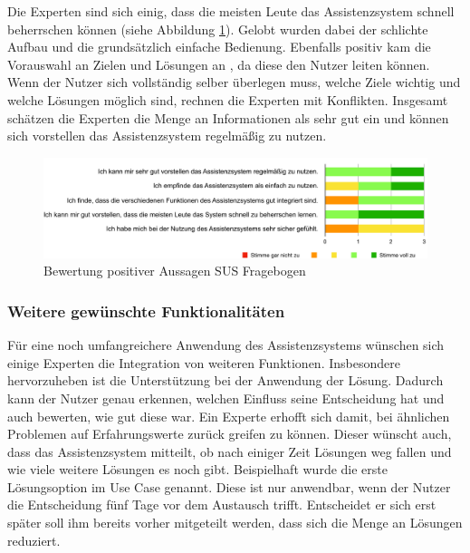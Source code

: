 Die Experten sind sich einig, dass die meisten Leute das Assistenzsystem schnell beherrschen können (siehe Abbildung \ref{pic:SUS-positiv}). Gelobt wurden dabei der schlichte Aufbau und die grundsätzlich einfache Bedienung. Ebenfalls positiv kam die Vorauswahl an Zielen und Lösungen an , da diese den Nutzer leiten können. Wenn der Nutzer sich vollständig selber überlegen muss, welche Ziele wichtig und welche Lösungen möglich sind, rechnen die Experten mit Konflikten. Insgesamt schätzen die Experten die Menge an Informationen als sehr gut ein und können sich vorstellen das Assistenzsystem regelmäßig zu nutzen.
\begin{figure}[htb]
\centering
\includegraphics[scale=0.55]{DA_files/Bilder/Validierung/Bild-positive_Aussagen.pdf}
\caption{Bewertung positiver Aussagen SUS Fragebogen}
\label{pic:SUS-positiv}
\end{figure}

\subsubsection*{Weitere gewünschte Funktionalitäten}
Für eine noch umfangreichere Anwendung des Assistenzsystems wünschen sich einige Experten die Integration von weiteren Funktionen. Insbesondere hervorzuheben ist die Unterstützung bei der Anwendung der Lösung. Dadurch kann der Nutzer genau erkennen, welchen Einfluss seine Entscheidung hat und auch bewerten, wie gut diese war. Ein Experte erhofft sich damit, bei ähnlichen Problemen auf Erfahrungswerte zurück greifen zu können. Dieser wünscht auch, dass das Assistenzsystem mitteilt, ob nach einiger Zeit Lösungen weg fallen und wie viele weitere Lösungen es noch gibt. Beispielhaft wurde die erste Lösungsoption im Use Case genannt. Diese ist nur anwendbar, wenn der Nutzer die Entscheidung fünf Tage vor dem Austausch trifft. Entscheidet er sich erst später soll ihm bereits vorher mitgeteilt werden, dass sich die Menge an Lösungen reduziert. 

